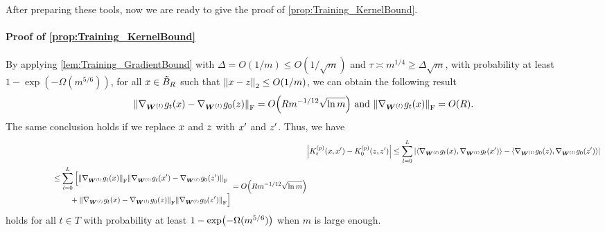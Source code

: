 After preparing these tools, now we are ready to give the proof of \cref{prop:Training_KernelBound}.

\paragraph{Proof of \cref{prop:Training_KernelBound}}
By applying \cref{lem:Training_GradientBound} with $\Delta=O(1/m)\leq O(1/\sqrt{m})$ and $\tau \asymp m^{1/4}\geq \Delta\sqrt{m}$, with probability at least $1 - \exp(-\Omega(m^{5/6}))$, for all $x\in\tilde{B}_R$ such that $\norm{x-z}_2\leq O(1/m)$, we can obtain the following result
\begin{align*}
  \norm{ \nabla_{\bm{W}^{(l)}} g_t(\x)- \nabla_{\bm{W}^{(l)}} g_0(\z) }_{\mr{F}}
  = O\xkm{ R m^{-1/12}\sqrt{ \ln m}}~\text{and}~\norm{ \nabla_{\bm{W}^{(l)}} g_t(\x)}_{\mr{F}} = O(R).
\end{align*}
The same conclusion holds if we replace $x$ and $z$ with $x'$ and $z'$.
Thus, we have
\begin{align*}
  &\abs{K^{(p)}_t(\x,\x') - K^{(p)}_0(\z,\z')}\leq \sum_{l=0}^L\abs{\ang{\nabla_{\bm{W}^{(l)}} g_t(\x), \nabla_{\bm{W}^{(l)}} g_t(\x') } - \ang{\nabla_{\bm{W}^{(l)}} g_0(\z), \nabla_{\bm{W}^{(l)}} g_0(\z') }} \\
  \begin{split}
    &\qquad\qquad\qquad \leq \sum_{l=0}^L \Big[\norm{ \nabla_{\bm{W}^{(l)}} g_t(\x)}_{\mr{F}} \norm{ \nabla_{\bm{W}^{(l)}} g_t(\x')- \nabla_{\bm{W}^{(l)}} g_0(\z') }_{\mr{F}}\\
    &\qquad\qquad\qquad\qquad\,\, + \norm{ \nabla_{\bm{W}^{(l)}} g_t(\x)- \nabla_{\bm{W}^{(l)}} g_0(\z) }_{\mr{F}}\norm{ \nabla_{\bm{W}^{(l)}} g_0(\z')}_{\mr{F}}\Big]
  \end{split}
  = O\xkm{R m^{-1/12}\sqrt{ \ln m}}
\end{align*}
holds for all $t\in T$ with probability at least $1 - \exp\xkm{-\Omega(m^{5/6})}$ when $m$ is large enough.



